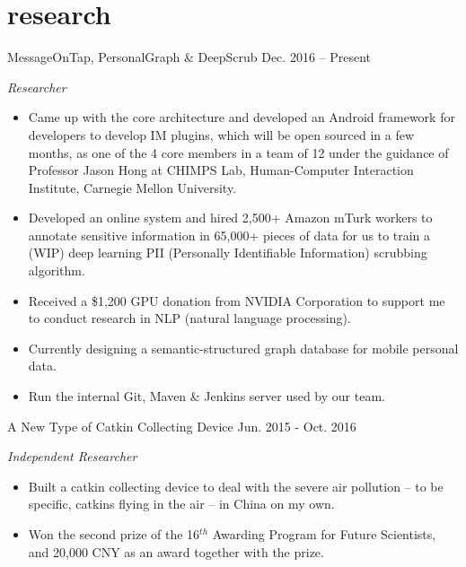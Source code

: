 \documentclass[hidelinks]{adamyi-cv} %
\begin{document}
\section{research}

\begin{entrylist}


\entry
{MessageOnTap, PersonalGraph \& DeepScrub}
{Dec. 2016 -- Present}
{\emph{Researcher}
\begin{itemize}
\item Came up with the core architecture and developed an Android framework for developers to develop IM plugins, which will be open sourced in a few months, as one of the 4 core members in a team of 12 under the guidance of Professor Jason Hong at CHIMPS Lab, Human-Computer Interaction Institute, Carnegie Mellon University.
\item Developed an online system and hired 2,500+ Amazon mTurk workers to annotate sensitive information in 65,000+ pieces of data for us to train a (WIP) deep learning PII (Personally Identifiable Information) scrubbing algorithm.
\item Received a \$1,200 GPU donation from NVIDIA Corporation to support me to conduct research in NLP (natural language processing).
\item Currently designing a semantic-structured graph database for mobile personal data.
\item Run the internal Git, Maven \& Jenkins server used by our team.
\end{itemize}}


\entry
{A New Type of Catkin Collecting Device}
{Jun. 2015 - Oct. 2016}
{\emph{Independent Researcher}
\begin{itemize}
\item Built a catkin collecting device to deal with the severe air pollution – to be specific, catkins flying in the air – in China on my own.
\item Won the second prize of the 16$^{th}$ Awarding Program for Future Scientists, and 20,000 CNY as an award together with the prize.
\end{itemize}}



\end{entrylist}
\end{document}
